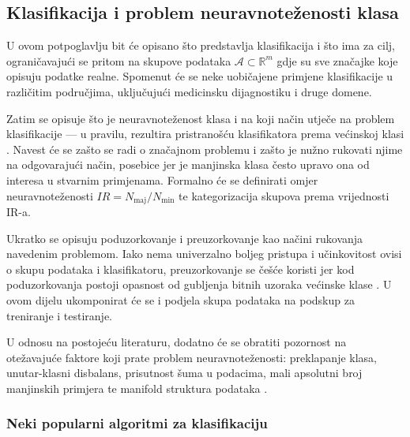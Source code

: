 
\subsection{Klasifikacija i problem neuravnote\v{z}enosti klasa}

U ovom potpoglavlju bit \'{c}e opisano \v{s}to predstavlja klasifikacija
\cite{duda2000,theodoridis2008} i \v{s}to ima za cilj, ograni\v{c}avaju\'{c}i
se pritom na skupove podataka $\mathcal{A} \subset \mathbb{R}^m$ gdje su
sve zna\v{c}ajke koje opisuju podatke realne. Spomenut \'{c}e se neke
uobi\v{c}ajene primjene klasifikacije u razli\v{c}itim podru\v{c}jima,
uklju\v{c}uju\'{c}i medicinsku dijagnostiku \cite{odajima2014,kamel2019} i
druge domene.

Zatim se opisuje \v{s}to je neuravnote\v{z}enost klasa i na koji
na\v{c}in utje\v{c}e na problem klasifikacije --- u pravilu, rezultira
pristrano\v{s}\'{c}u klasifikatora prema ve\'{c}inskoj klasi
\cite{he2009,lopez2013}. Navest \'{c}e se za\v{s}to se radi o zna\v{c}ajnom
problemu i za\v{s}to je nu\v{z}no rukovati njime na odgovaraju\'{c}i
na\v{c}in, posebice jer je manjinska klasa \v{c}esto upravo ona od
interesa u stvarnim primjenama. Formalno \'{c}e se definirati omjer
neuravnote\v{z}enosti $IR = N_{\text{maj}} / N_{\text{min}}$ te
kategorizacija skupova prema vrijednosti IR-a.

Ukratko se opisuju poduzorkovanje i preuzorkovanje kao na\v{c}ini
rukovanja navedenim problemom. Iako nema univerzalno boljeg pristupa i
u\v{c}inkovitost ovisi o skupu podataka i klasifikatoru, preuzorkovanje
se \v{c}e\v{s}\'{c}e koristi jer kod poduzorkovanja postoji opasnost od
gubljenja bitnih uzoraka ve\'{c}inske klase \cite{bajer2019}. U ovom
dijelu ukomponirat \'{c}e se i podjela skupa podataka na podskup za
treniranje i testiranje.

U odnosu na postoje\'{c}u literaturu, dodatno \'{c}e se obratiti
pozornost na ote\v{z}avaju\'{c}e faktore koji prate problem
neuravnote\v{z}enosti: preklapanje klasa, unutar-klasni disbalans,
prisutnost \v{s}uma u podacima, mali apsolutni broj manjinskih primjera
te manifold struktura podataka \cite{krawczyk2016}.

\subsubsection{Neki popularni algoritmi za klasifikaciju}


